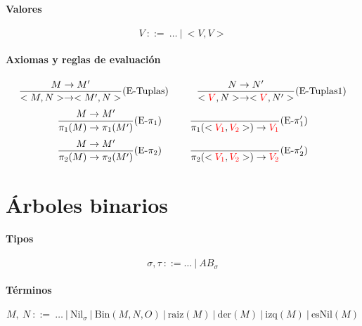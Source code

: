 \paragraph{Valores}
$$V~::=~\dots~|~<V,V>$$

\paragraph{Axiomas y reglas de evaluación}
\begin{equation*}
\frac{M\to M'}{<M,N>\to<M',N>}(\text{E-Tuplas})\hspace*{1cm}\frac{N\to N'}{<\color{red}V\color{black},N>\to<\color{red}V\color{black},N'>}(\text{E-Tuplas1})
\end{equation*}
\vspace*{5mm}
\begin{equation*}
\frac{M\to M'}{\pi_1(M)\to\pi_1(M')}(\text{E-}\pi_1)\hspace*{1cm}\frac{}{\pi_1(<\color{red}V_1\color{black}, \color{red}V_2\color{black}>)\to\color{red}V_1\color{black}}(\text{E-}\pi'_1)
\end{equation*}
\vspace*{5mm}
\begin{equation*}
\frac{M\to M'}{\pi_2(M)\to\pi_2(M')}(\text{E-}\pi_2)\hspace*{1cm}\frac{}{\pi_2(<\color{red}V_1\color{black}, \color{red}V_2\color{black}>)\to\color{red}V_2\color{black}}(\text{E-}\pi'_2)
\end{equation*}

\section{Árboles binarios}

\paragraph{Tipos}
$$\sigma,\tau~::= \dots~|~AB_\sigma$$

\paragraph{Términos}
$$M,~N~::=~\dots~|~\text{Nil}_\sigma~|~\text{Bin}(M, N, O)~|~\text{raiz}(M)~|~\text{der}(M)~|~\text{izq}(M)~|~\text{esNil}(M)$$
